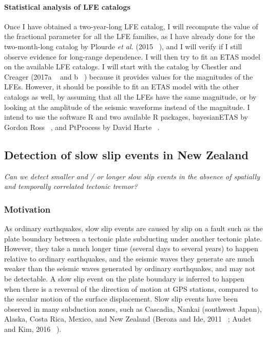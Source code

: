 \documentclass[letterpaper, 12pt]{article}
\begin{document}
\paragraph{Statistical analysis of LFE catalogs} Once I have obtained a two-year-long LFE catalog, I will recompute the value of the fractional parameter for all the LFE families, as I have already done for the two-month-long catalog by Plourde \textit{et al.} (2015 ~\cite{PLO_2015}), and I will verify if I still observe evidence for long-range dependence. I will then try to fit an ETAS model on the available LFE catalogs. I will start with the catalog by Chestler and Creager (2017a ~\cite{CHE_2017_JGR} and b ~\cite{CHE_2017_G3}) because it provides values for the magnitudes of the LFEs. However, it should be possible to fit an ETAS model with the other catalogs as well, by assuming that all the LFEs have the same magnitude, or by looking at the amplitude of the seismic waveforms instead of the magnitude. I intend to use the software R and two available R packages, bayesianETAS by Gordon Ross ~\cite{ROS_2016}, and PtProcess by David Harte ~\cite{HAR_2010}.

\subsection{Detection of slow slip events in New Zealand}

\textit{Can we detect smaller and / or longer slow slip events in the absence of spatially and temporally correlated tectonic tremor?}

\subsubsection*{Motivation}

As ordinary earthquakes, slow slip events are caused by slip on a fault such as the plate boundary between a tectonic plate subducting under another tectonic plate. However, they take a much longer time (several days to several years) to happen relative to ordinary earthquakes, and the seismic waves they generate are much weaker than the seismic waves generated by ordinary earthquakes, and may not be detectable.  A slow slip event on the plate boundary is inferred to happen when there is a reversal of the direction of motion at GPS stations, compared to the secular motion of the surface displacement. Slow slip events have been observed in many subduction zones, such as Cascadia, Nankai (southwest Japan), Alaska, Costa Rica, Mexico, and New Zealand (Beroza and Ide, 2011 ~\cite{BER_2011}; Audet and Kim, 2016 ~\cite{AUD_2016}). \\
\end{document}
